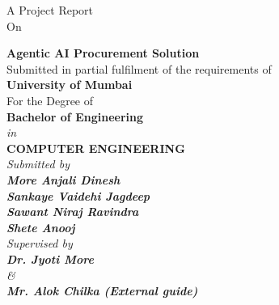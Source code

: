 
\begin{titlepage}
\thispagestyle{empty}

{\centering
{A Project Report}\\ 
\vspace{0.2cm}
{On}
\vspace{0.4cm}
\\
}
 
{\centering
\large

{\LARGE\bf Agentic AI Procurement Solution}\\
\vspace{0.5cm}
{Submitted in partial fulfilment of the requirements of } \\
\vspace{0.2cm}
{\bf{University of Mumbai}} \\
\vspace{0.2cm}
{For the Degree of} \\
\vspace{0.2cm}
{\bf {Bachelor of Engineering}} \\
{\it{in}} \\
{\bf COMPUTER ENGINEERING } \\
\vspace{0.5cm}
\it{Submitted by} \\
\vspace{.2cm}
\rm
{\large \bf {More Anjali Dinesh}}\\
{\large \bf {Sankaye Vaidehi Jagdeep}}\\
{\large \bf {Sawant Niraj Ravindra}}\\
{\large \bf {Shete Anooj}}\\

\vspace{0.6cm}
{\it{Supervised by}} \\
\vspace{.2cm}
\hspace{.05cm} {\large \textbf {Dr. Jyoti More}}\\
\vspace{0.2cm}
{\it{\&}} \\
\vspace{.2cm}
\hspace{.05cm} {\large \textbf {Mr. Alok Chilka (External guide)}}\\
\vspace{0.1cm}




}
\end{titlepage}
